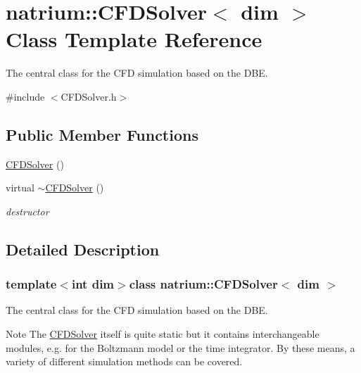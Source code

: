 \hypertarget{classnatrium_1_1CFDSolver}{\section{natrium\-:\-:\-C\-F\-D\-Solver$<$ dim $>$ \-Class \-Template \-Reference}
\label{classnatrium_1_1CFDSolver}
}


\-The central class for the \-C\-F\-D simulation based on the \-D\-B\-E.  




{\ttfamily \#include $<$\-C\-F\-D\-Solver.\-h$>$}

\subsection*{\-Public \-Member \-Functions}
\begin{DoxyCompactItemize}
\item 
\hyperlink{classnatrium_1_1CFDSolver_a3f085c00939b08434f91a7c7cd6bf568}{\-C\-F\-D\-Solver} ()
\item 
\hypertarget{classnatrium_1_1CFDSolver_a7ca9bd709255ac87b34f869c984b913b}{virtual \hyperlink{classnatrium_1_1CFDSolver_a7ca9bd709255ac87b34f869c984b913b}{$\sim$\-C\-F\-D\-Solver} ()}\label{classnatrium_1_1CFDSolver_a7ca9bd709255ac87b34f869c984b913b}

\begin{DoxyCompactList}\small\item\em destructor \end{DoxyCompactList}\end{DoxyCompactItemize}


\subsection{\-Detailed \-Description}
\subsubsection*{template$<$int dim$>$class natrium\-::\-C\-F\-D\-Solver$<$ dim $>$}

\-The central class for the \-C\-F\-D simulation based on the \-D\-B\-E. 

\begin{DoxyNote}{\-Note}
\-The \hyperlink{classnatrium_1_1CFDSolver}{\-C\-F\-D\-Solver} itself is quite static but it contains interchangeable modules, e.\-g. for the \-Boltzmann model or the time integrator. \-By these means, a variety of different simulation methods can be covered. 
\end{DoxyNote}


